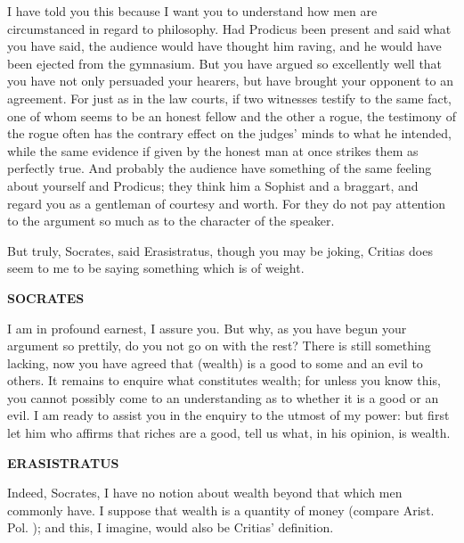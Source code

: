 \documentclass[11pt,letter]{article}
\begin{document}
\par  I have told you this because I want you to understand how men are circumstanced in regard to philosophy. Had Prodicus been present and said what you have said, the audience would have thought him raving, and he would have been ejected from the gymnasium. But you have argued so excellently well that you have not only persuaded your hearers, but have brought your opponent to an agreement. For just as in the law courts, if two witnesses testify to the same fact, one of whom seems to be an honest fellow and the other a rogue, the testimony of the rogue often has the contrary effect on the judges' minds to what he intended, while the same evidence if given by the honest man at once strikes them as perfectly true. And probably the audience have something of the same feeling about yourself and Prodicus; they think him a Sophist and a braggart, and regard you as a gentleman of courtesy and worth. For they do not pay attention to the argument so much as to the character of the speaker.

\par  But truly, Socrates, said Erasistratus, though you may be joking, Critias does seem to me to be saying something which is of weight.

\par \textbf{SOCRATES}
\par   I am in profound earnest, I assure you. But why, as you have begun your argument so prettily, do you not go on with the rest? There is still something lacking, now you have agreed that (wealth) is a good to some and an evil to others. It remains to enquire what constitutes wealth; for unless you know this, you cannot possibly come to an understanding as to whether it is a good or an evil. I am ready to assist you in the enquiry to the utmost of my power:  but first let him who affirms that riches are a good, tell us what, in his opinion, is wealth.

\par \textbf{ERASISTRATUS}
\par   Indeed, Socrates, I have no notion about wealth beyond that which men commonly have. I suppose that wealth is a quantity of money (compare Arist. Pol. ); and this, I imagine, would also be Critias' definition.
\end{document}
